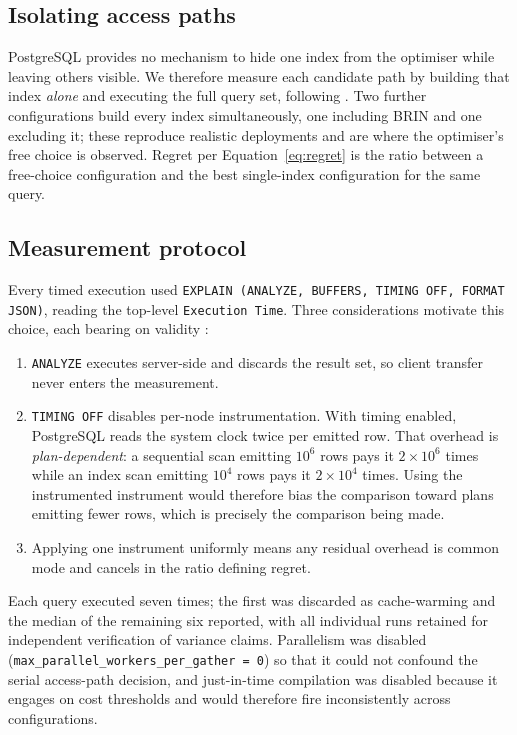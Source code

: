 \documentclass[preprint,12pt,authoryear]{elsarticle}
\begin{document}
\subsection{Isolating access paths}

PostgreSQL provides no mechanism to hide one index from the optimiser
while leaving others visible. We therefore measure each candidate path
by building that index \emph{alone} and executing the full query set,
following \citet{wongkham2022updatable}. Two further configurations
build every index simultaneously, one including BRIN and one excluding
it; these reproduce realistic deployments and are where the optimiser's
free choice is observed. Regret per Equation~\eqref{eq:regret} is the
ratio between a free-choice configuration and the best single-index
configuration for the same query.

\subsection{Measurement protocol}
\label{sec:protocol}

Every timed execution used
\texttt{EXPLAIN (ANALYZE, BUFFERS, TIMING OFF, FORMAT JSON)}, reading
the top-level \texttt{Execution Time}. Three considerations motivate
this choice, each bearing on validity \citep{raasveldt2018fair}:

\begin{enumerate}
\item \texttt{ANALYZE} executes server-side and discards the result
  set, so client transfer never enters the measurement.
\item \texttt{TIMING OFF} disables per-node instrumentation. With
  timing enabled, PostgreSQL reads the system clock twice per emitted
  row. That overhead is \emph{plan-dependent}: a sequential scan
  emitting $10^6$ rows pays it $2 \times 10^6$ times while an index
  scan emitting $10^4$ rows pays it $2 \times 10^4$ times. Using the
  instrumented instrument would therefore bias the comparison toward
  plans emitting fewer rows, which is precisely the comparison being
  made.
\item Applying one instrument uniformly means any residual overhead is
  common mode and cancels in the ratio defining regret.
\end{enumerate}

Each query executed seven times; the first was discarded as
cache-warming and the median of the remaining six reported, with all
individual runs retained for independent verification of variance
claims. Parallelism was disabled
(\texttt{max\_parallel\_workers\_per\_gather = 0}) so that it could not
confound the serial access-path decision, and just-in-time compilation
was disabled because it engages on cost thresholds and would therefore
fire inconsistently across configurations.
\end{document}

